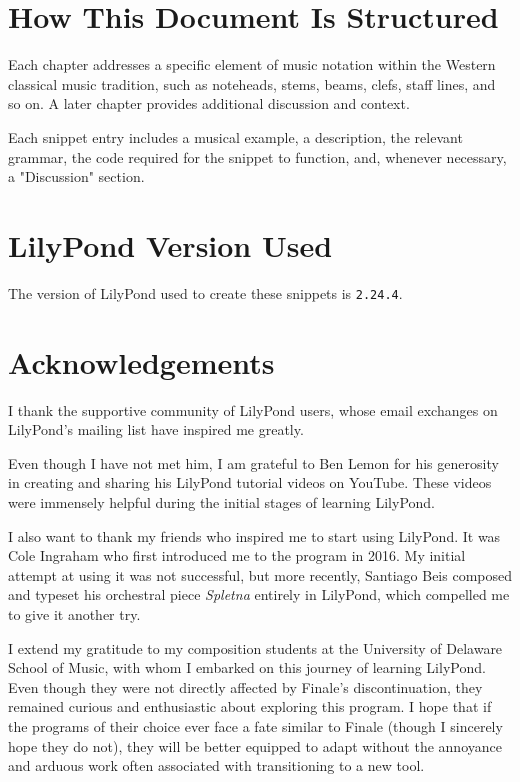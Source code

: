 \documentclass[11pt, oneside]{book}   	%
\begin{document}
\section{How This Document Is Structured}
Each chapter addresses a specific element of music notation within the Western classical music tradition, such as noteheads, stems, beams, clefs, staff lines, and so on. A later chapter provides additional discussion and context.

Each snippet entry includes a musical example, a description, the relevant grammar, the code required for the snippet to function, and, whenever necessary, a "Discussion" section.

\section{LilyPond Version Used}
The version of LilyPond used to create these snippets is \verb|2.24.4|.

\section{Acknowledgements}
I thank the supportive community of LilyPond users, whose email exchanges on LilyPond's mailing list have inspired me greatly.

Even though I have not met him, I am grateful to Ben Lemon for his generosity in creating and sharing his LilyPond tutorial videos on YouTube. These videos were immensely helpful during the initial stages of learning LilyPond.

I also want to thank my friends who inspired me to start using LilyPond. It was Cole Ingraham who first introduced me to the program in 2016. My initial attempt at using it was not successful, but more recently, Santiago Beis composed and typeset his orchestral piece \textit{Spletna} entirely in LilyPond, which compelled me to give it another try.

I extend my gratitude to my composition students at the University of Delaware School of Music, with whom I embarked on this journey of learning LilyPond. Even though they were not directly affected by Finale's discontinuation, they remained curious and enthusiastic about exploring this program. I hope that if the programs of their choice ever face a fate similar to Finale (though I sincerely hope they do not), they will be better equipped to adapt without the annoyance and arduous work often associated with transitioning to a new tool.

\clearpage
\vfill \break
\end{document}
